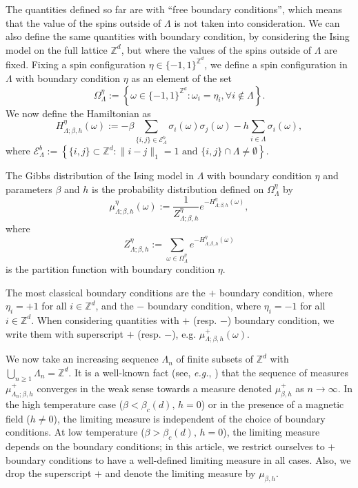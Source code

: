 \documentclass{amsart}
\newcommand{\field}[1]{\mathbb{#1}}
\newcommand{\Z}{\field{Z}}
\newcommand{\dist}[2]{\|#1 - #2\|_1}
\def\EEE{\mathcal{E}}
\numberwithin{equation}{section}
\theoremstyle{remark}
\begin{document}
The quantities defined so far are with ``free boundary conditions'', which means that the value of the spins outside of $\Lambda$ is not taken into consideration. We can also define the same quantities with boundary condition, by considering the Ising model on the full lattice $\Z^d$, but where the values of the spins outside of $ \Lambda $ are fixed.
Fixing a spin configuration $\eta \in \{-1,1\}^{\Z^d}$, we define a spin configuration in $\Lambda$ with boundary condition $\eta$ as an element of the set
$$\Omega^{\eta}_{\Lambda} := \left\{ \omega \in \{-1,1\}^{\Z^d} : \omega_i = \eta_i, \forall i \notin \Lambda \right\}.$$
We now define the Hamiltonian as
$$H^{\eta}_{\Lambda;\beta, h} (\omega):= -\beta \sum_{\{i,j\} \in \EEE^{b}_{\Lambda} } \sigma_i(\omega) \sigma_j(\omega) - h \sum_{i \in \Lambda} \sigma_i(\omega),$$
where $\EEE^{b}_{\Lambda} := \left\lbrace \{i,j\} \subset \Z^d : \dist{i}{j}=1 \text{ and } \{i,j\} \cap \Lambda \neq \emptyset \right\rbrace .$

The Gibbs distribution of the Ising model in $\Lambda$ with boundary condition $\eta$ and parameters $\beta$ and $h$ is the probability distribution defined on $\Omega^{\eta}_{\Lambda}$ by
$$\mu^{\eta}_{\Lambda;\beta, h} (\omega):= \frac{1}{Z^{\eta}_{\Lambda;\beta, h}} e^{-H^{\eta}_{\Lambda;\beta, h} (\omega)},$$
where
$$Z^{\eta}_{\Lambda;\beta, h}:= \sum_{\omega \in \Omega^{\eta}_{\Lambda}} e^{-H^{\eta}_{\Lambda;\beta, h} (\omega)}$$
is the partition function with boundary condition $\eta$.

The most classical boundary conditions are the $+$ boundary condition, where $\eta_i = +1$ for all $i \in \Z^d$,
and the $-$ boundary condition, where $\eta_i = -1$ for all $i \in \Z^d$. When considering quantities with $+$ (resp. $-$) boundary condition, we write them with superscript $+$ (resp. $-$), e.g. $\mu^{+}_{\Lambda;\beta, h} (\omega).$

We now take an increasing sequence $\Lambda_n$ of finite subsets of $\Z^d$
with $\bigcup_{n \ge 1} \Lambda_n=\Z^d$.
It is a well-known fact (see, {\em e.g.}, \cite[Chapter 3]{Velenik})
that the sequence of measures $\mu^{+}_{\Lambda_n;\beta, h}$ converges in the weak sense
towards a measure denoted $\mu^+_{\beta, h}$ as $n \rightarrow \infty$.
In the high temperature case ($\beta < \beta_c(d),\, h=0$) or in the presence of a magnetic field 
($h \ne 0$), the limiting measure is independent of the choice of boundary conditions.
At low temperature ($\beta > \beta_c(d),\, h=0$), the limiting measure depends on the boundary conditions;
in this article, we restrict ourselves to $+$ boundary conditions
to have a well-defined limiting measure in all cases.
Also, we drop the superscript $+$ and denote the limiting measure by $\mu_{\beta,h}$.
\end{document}

